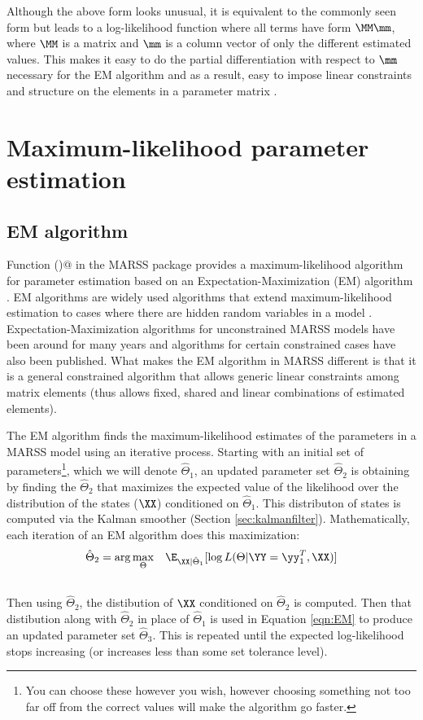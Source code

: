 Although the above form looks unusual, it is equivalent to the commonly seen form but leads to a log-likelihood function where all terms have form 
$\MM\mm$, where $\MM$ is a matrix and $\mm$ is a column vector of only the different estimated values.  This makes it easy to do the partial differentiation with respect
to $\mm$ necessary for the EM algorithm and as a result, easy to impose linear constraints and structure on the elements in a parameter matrix \citep{Holmes2010}.

\section{Maximum-likelihood parameter estimation}

\subsection{EM algorithm}

Function \verb@MARSSkem()@ in the MARSS package provides a maximum-likelihood algorithm for parameter estimation based on an Expectation-Maximization (EM) algorithm  \citep{Holmes2010}. EM algorithms are widely used algorithms that extend maximum-likelihood estimation to cases where there are hidden random variables in a model \citep{Dempsteretal1977, Harvey1989, HarveyShephard1993, McLachlanKrishnan2008}.   Expectation-Maximization algorithms for unconstrained MARSS models have been around for many years and algorithms for certain constrained cases have also been published.  What makes the EM algorithm in MARSS different is that it is a general constrained algorithm that allows generic linear constraints among matrix elements (thus allows fixed, shared and linear combinations of estimated elements). 

The EM algorithm finds the maximum-likelihood estimates of the parameters in a MARSS model using an iterative process.  Starting with an initial set of parameters\footnote{You can choose these however you wish, however choosing something not too far off from the correct values will make the algorithm go faster.}, which we will denote $\hat{\Theta}_1$, an updated parameter set $\hat{\Theta}_2$ is obtaining by finding the $\hat{\Theta}_2$ that maximizes the expected value of the likelihood over the distribution of the states ($\XX$) conditioned on $\hat{\Theta}_1$. This distributon of states is computed via the Kalman smoother (Section \ref{sec:kalmanfilter}).  Mathematically, each iteration of an EM algorithm does this maximization:
\begin{align}\label{eqn:EM}
	\hat{\Theta}_2 &= \arg\underset{\Theta}{\max} \quad \E_{\XX|\hat{\Theta}_1}[\log L(\Theta |\YY=\yy_1^T,\XX)]\\
\nonumber
\end{align}
Then using $\hat{\Theta}_2$, the distibution of $\XX$ conditioned on $\hat{\Theta}_2$ is computed.  Then that distibution along with $\hat{\Theta}_2$ in place of $\hat{\Theta}_1$ is used in Equation \eqref{eqn:EM} to produce an updated parameter set $\hat{\Theta}_3$.  This is repeated until the expected log-likelihood stops increasing (or increases less than some set tolerance level).

